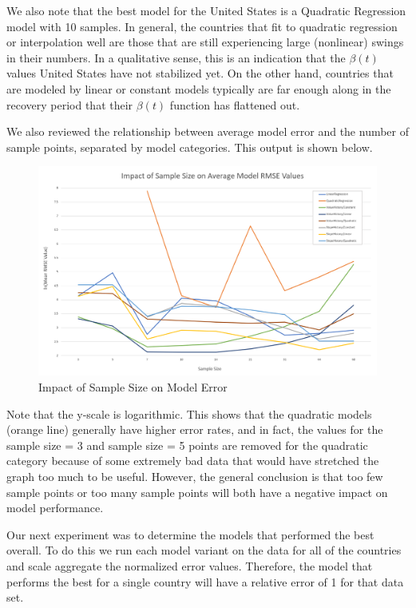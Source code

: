 \documentclass[11pt]{article}
\begin{document}
We also note that the best model for the United States is a Quadratic Regression model with 10 samples. In general, the countries that fit to quadratic regression or interpolation well are those that are still experiencing large (nonlinear) swings in their numbers. In a qualitative sense, this is an indication that the $\beta(t)$ values United States have not stabilized yet. On the other hand, countries that are modeled by linear or constant models typically are far enough along in the recovery period that their $\beta(t)$ function has flattened out.

We also reviewed the relationship between average model error and the number of sample points, separated by model categories. This output is shown below.

\begin{figure}[h]
    \includegraphics[width=16cm]{images/SampleSizeGraph.png}
    \centering
    \caption{Impact of Sample Size on Model Error}
    \label{fig:sample-size-graph}
\end{figure}

Note that the y-scale is logarithmic. This shows that the quadratic models (orange line) generally have higher error rates, and in fact, the values for the sample size = 3 and sample size = 5 points are removed for the quadratic category because of some extremely bad data that would have stretched the graph too much to be useful. However, the general conclusion is that too few sample points or too many sample points will both have a negative impact on model performance.

Our next experiment was to determine the models that performed the best overall. To do this we run each model variant on the data for all of the countries and scale aggregate the normalized error values. Therefore, the model that performs the best for a single country will have a relative error of 1 for that data set.
\end{document}
